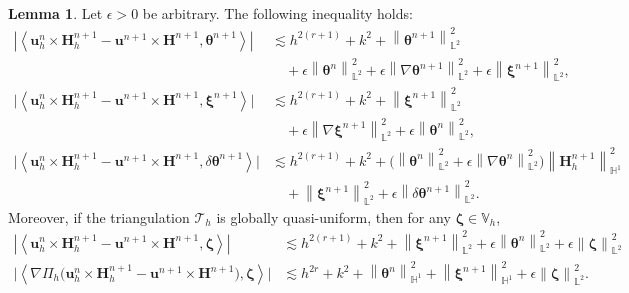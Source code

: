 \documentclass[11pt, reqno]{amsart}
\theoremstyle{definition}
\newtheorem{lemma}[theorem]{Lemma}
\theoremstyle{remark}
\numberwithin{equation}{section}
\newcommand{\bff}{\boldsymbol}
\newcommand{\bb}{\mathbb}
\newcommand{\norm}[2]{\left\|{#1}\right\|_{#2}}
\newcommand{\inpro}[2]{\left\langle#1,#2\right\rangle}
\begin{document}
\begin{lemma}\label{lem:cross disc euler}
	Let $\epsilon>0$ be arbitrary. The following inequality holds:
	\begin{align}
		\label{equ:cross theta est euler}
		\nonumber
		\left| \inpro{\bff{u}_h^{n} \times \bff{H}_h^{n+1} - \bff{u}^{n+1} \times \bff{H}^{n+1}}{\bff{\theta}^{n+1}} \right| 
		&\lesssim
		h^{2(r+1)} + k^2+ \norm{\bff{\theta}^{n+1}}{\bb{L}^2}^2
		\\
		&\quad
		+ \epsilon \norm{\bff{\theta}^n}{\bb{L}^2}^2
		+ \epsilon \norm{\nabla \bff{\theta}^{n+1}}{\bb{L}^2}^2
		+ \epsilon \norm{\bff{\xi}^{n+1}}{\bb{L}^2}^2,
		\\
		\nonumber
		\label{equ:cross xi euler}
		\big| \inpro{\bff{u}_h^n \times \bff{H}_h^{n+1}- \bff{u}^{n+1} \times \bff{H}^{n+1}}{\bff{\xi}^{n+1}} \big| 
		&\lesssim
		h^{2(r+1)} 
		+ 
		k^2
		+
		\norm{\bff{\xi}^{n+1}}{\bb{L}^2}^2 
		\\
		&\quad
		+ 
		\epsilon \norm{\nabla \bff{\xi}^{n+1}}{\bb{L}^2}^2
		+
		\epsilon \norm{\bff{\theta}^n}{\bb{L}^2}^2,
		\\
		\label{equ:cross dt theta euler}
		\nonumber
		\big| \inpro{\bff{u}_h^n \times \bff{H}_h^{n+1}- \bff{u}^{n+1} \times \bff{H}^{n+1}}{\delta \bff{\theta}^{n+1}} \big| 
		&\lesssim
		h^{2(r+1)} + k^2
		+
		\big( \norm{\bff{\theta}^n}{\bb{L}^2}^2 + \epsilon \norm{\nabla \bff{\theta}^n}{\bb{L}^2}^2 \big) \norm{\bff{H}_h^{n+1}}{\bb{H}^1}^2
		\\
		&\quad
		+
		\norm{\bff{\xi}^{n+1}}{\bb{L}^2}^2
		+
		\epsilon \norm{\delta \bff{\theta}^{n+1}}{\bb{L}^2}^2.
	\end{align}
	Moreover, if the triangulation $\mathcal{T}_h$ is globally quasi-uniform, then for any $\bff{\zeta} \in \bb{V}_h$,
	\begin{align}\label{equ:cross est euler}
		\left| \inpro{\bff{u}_h^{n} \times \bff{H}_h^{n+1} - \bff{u}^{n+1} \times \bff{H}^{n+1}}{\bff{\zeta}} \right| 
		&\lesssim
		h^{2(r+1)} + k^2+ \norm{\bff{\xi}^{n+1}}{\bb{L}^2}^2
		+ \epsilon \norm{\bff{\theta}^n}{\bb{L}^2}^2
		+ \epsilon \norm{\bff{\zeta}}{\bb{L}^2}^2
		\\
		\label{equ:cross nab est euler}
		\big|\inpro{\nabla\Pi_h\big(\bff{u}_h^n \times \bff{H}_h^{n+1}- \bff{u}^{n+1} \times \bff{H}^{n+1}\big)}{\bff{\zeta}} \big|
		&\lesssim
		h^{2r} + k^2
		+
		\norm{\bff{\theta}^n}{\bb{H}^1}^2
		+
		\norm{\bff{\xi}^{n+1}}{\bb{H}^1}^2
		+
		\epsilon \norm{\bff{\zeta}}{\bb{L}^2}^2.
	\end{align}
\end{lemma}
\end{document}

